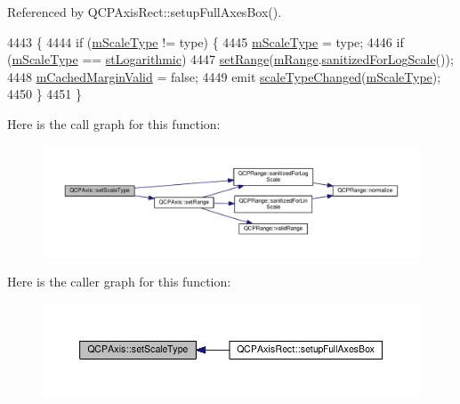 Referenced by Q\+C\+P\+Axis\+Rect\+::setup\+Full\+Axes\+Box().


\begin{DoxyCode}
4443                                                 \{
4444   \textcolor{keywordflow}{if} (\hyperlink{class_q_c_p_axis_ad706039549cbbbec5fcb2baf7894e04d}{mScaleType} != type) \{
4445     \hyperlink{class_q_c_p_axis_ad706039549cbbbec5fcb2baf7894e04d}{mScaleType} = type;
4446     \textcolor{keywordflow}{if} (\hyperlink{class_q_c_p_axis_ad706039549cbbbec5fcb2baf7894e04d}{mScaleType} == \hyperlink{class_q_c_p_axis_a36d8e8658dbaa179bf2aeb973db2d6f0abf5b785ad976618816dc6f79b73216d4}{stLogarithmic})
4447       \hyperlink{class_q_c_p_axis_aebdfea5d44c3a0ad2b4700cd4d25b641}{setRange}(\hyperlink{class_q_c_p_axis_a1ee36773c49062d751560e11f90845f7}{mRange}.\hyperlink{class_q_c_p_range_aaf6a9046e78d91eeb8e89584fe46b034}{sanitizedForLogScale}());
4448     \hyperlink{class_q_c_p_axis_a2cde37b6e385f47e11322df4ac1b0e9b}{mCachedMarginValid} = \textcolor{keyword}{false};
4449     emit \hyperlink{class_q_c_p_axis_a3505ed8a93bd2e349d858d84996bf767}{scaleTypeChanged}(\hyperlink{class_q_c_p_axis_ad706039549cbbbec5fcb2baf7894e04d}{mScaleType});
4450   \}
4451 \}
\end{DoxyCode}


Here is the call graph for this function\+:\nopagebreak
\begin{figure}[H]
\begin{center}
\leavevmode
\includegraphics[width=350pt]{class_q_c_p_axis_adef29cae617af4f519f6c40d1a866ca6_cgraph}
\end{center}
\end{figure}




Here is the caller graph for this function\+:\nopagebreak
\begin{figure}[H]
\begin{center}
\leavevmode
\includegraphics[width=350pt]{class_q_c_p_axis_adef29cae617af4f519f6c40d1a866ca6_icgraph}
\end{center}
\end{figure}


